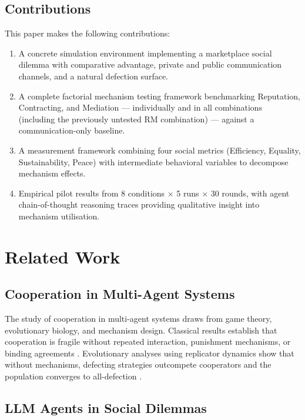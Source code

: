 \documentclass[12pt, a4paper]{article}
\begin{document}
\subsection{Contributions}

This paper makes the following contributions:

\begin{enumerate}
  \item A concrete simulation environment implementing a marketplace social dilemma with comparative advantage, private and public communication channels, and a natural defection surface.
  \item A complete factorial mechanism testing framework benchmarking Reputation, Contracting, and Mediation — individually and in all combinations (including the previously untested RM combination) — against a communication-only baseline.
  \item A measurement framework combining four social metrics (Efficiency, Equality, Sustainability, Peace) with intermediate behavioral variables to decompose mechanism effects.
  \item Empirical pilot results from 8 conditions $\times$ 5 runs $\times$ 30 rounds, with agent chain-of-thought reasoning traces providing qualitative insight into mechanism utilisation.
\end{enumerate}

\section{Related Work}
\label{sec:related}

\subsection{Cooperation in Multi-Agent Systems}

The study of cooperation in multi-agent systems draws from game theory, evolutionary biology, and mechanism design. Classical results establish that cooperation is fragile without repeated interaction, punishment mechanisms, or binding agreements \citep{axelrod1984}. Evolutionary analyses using replicator dynamics show that without mechanisms, defecting strategies outcompete cooperators and the population converges to all-defection \citep{coopeval}.

\subsection{LLM Agents in Social Dilemmas}
\end{document}
